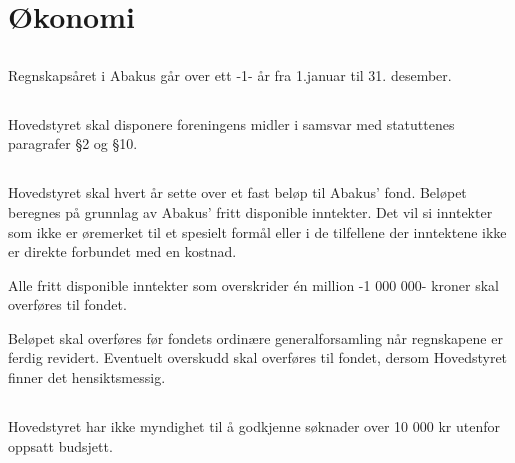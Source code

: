 \section{Økonomi}

\subsection{}
Regnskapsåret i Abakus går over ett -1- år fra 1.januar til 31. desember.

\subsection{}
Hovedstyret skal disponere foreningens midler i samsvar med statuttenes
paragrafer §2 og §10.

\subsection{}
Hovedstyret skal hvert år sette over et fast beløp til Abakus' fond. Beløpet
beregnes på grunnlag av Abakus' fritt disponible inntekter. Det vil si
inntekter som ikke er øremerket til et spesielt formål eller i de tilfellene
der inntektene ikke er direkte forbundet med en kostnad.

Alle fritt disponible inntekter som overskrider én million -1 000 000- kroner
skal overføres til fondet.

Beløpet skal overføres før fondets ordinære generalforsamling når regnskapene
er ferdig revidert. Eventuelt overskudd skal overføres til fondet, dersom
Hovedstyret finner det hensiktsmessig.

\subsection{}
Hovedstyret har ikke myndighet til å godkjenne søknader over 10 000 kr utenfor
oppsatt budsjett.
